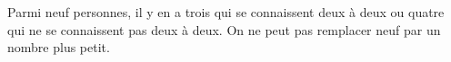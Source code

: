 Parmi neuf personnes, il y en a trois qui se connaissent deux à deux ou quatre qui ne se connaissent pas deux à deux. On ne peut pas remplacer neuf par un nombre plus petit.
